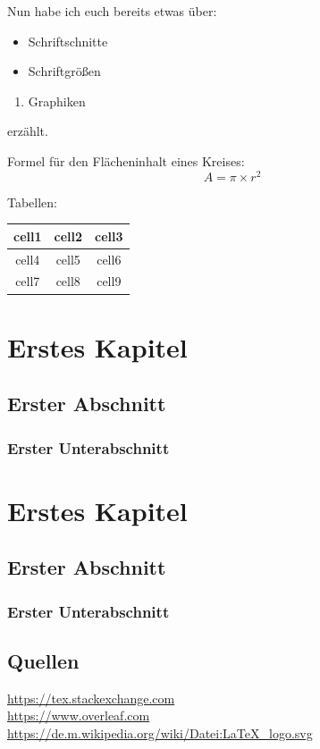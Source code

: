 \documentclass[twoside]{report}
\begin{document}
\vspace{1cm}



\vspace{1cm}


Nun habe ich euch bereits etwas über:
\begin{itemize}
    \item Schriftschnitte
    \item Schriftgrößen
\end{itemize}

\begin{enumerate}
    \item Graphiken
\end{enumerate}
erzählt.

\vspace{4cm}

Formel für den Flächeninhalt eines Kreises:
\[A=\pi×r^2\]

\vspace{1cm}


Tabellen:\\
\vspace{0.5cm}
\begin{tabular}{||c|c|c||}
\hline\hline
cell1 & cell2 & cell3\\
\hline
cell4 & cell5 & cell6\\
\hline
cell7 & cell8 & cell9\\
\hline\hline
\end{tabular}

\chapter{Erstes Kapitel}
\section{Erster Abschnitt}
\subsection{Erster Unterabschnitt}

\color{blue}

\chapter*{Erstes Kapitel}
\section*{Erster Abschnitt}
\subsection*{Erster Unterabschnitt}
\newpage

\color{black}
\section*{Quellen}
\url{https://tex.stackexchange.com}\\
\url{https://www.overleaf.com}\\
\url{https://de.m.wikipedia.org/wiki/Datei:LaTeX_logo.svg}
\end{document}
